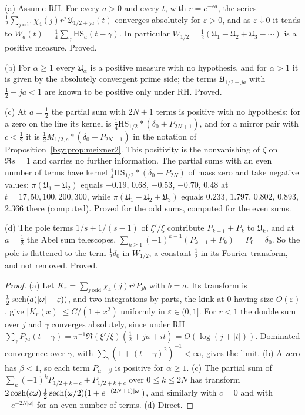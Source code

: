 \begin{proposition}\label{bsy:prop:levelser}
(a) Assume RH. For every $a>0$ and every $t$, with $r=e^{-\varepsilon a}$, the series $\tfrac12\sum_{j\ \mathrm{odd}}\chi_4(j)r^j\,\mathfrak U_{1/2+ja}(t)$ converges absolutely for $\varepsilon>0$, and as $\varepsilon\downarrow0$ it tends to $W_a(t)=\frac14\sum_\gamma\mathrm{HS}_a(t-\gamma)$. In particular $W_{1/2}=\tfrac12(\mathfrak U_1-\mathfrak U_2+\mathfrak U_3-\cdots)$ is a positive measure. Proved.

(b) For $\alpha\ge1$ every $\mathfrak U_\alpha$ is a positive measure with no hypothesis, and for $\alpha>1$ it is given by the absolutely convergent prime side; the terms $\mathfrak U_{1/2+ja}$ with $\frac12+ja<1$ are known to be positive only under RH. Proved.

(c) At $a=\frac12$ the partial sum with $2N+1$ terms is positive with no hypothesis: for a zero on the line its kernel is $\frac14\mathrm{HS}_{1/2}*(\delta_0+P_{2N+1})$, and for a mirror pair with $c<\frac12$ it is $\frac12M_{1/2,c}*(\delta_0+P_{2N+1})$ in the notation of Proposition~\ref{bsy:prop:meixner2}. This positivity is the nonvanishing of $\zeta$ on $\Re s=1$ and carries no further information. The partial sums with an even number of terms have kernel $\frac14\mathrm{HS}_{1/2}*(\delta_0-P_{2N})$ of mass zero and take negative values: $\pi(\mathfrak U_1-\mathfrak U_2)$ equals $-0.19$, $0.68$, $-0.53$, $-0.70$, $0.48$ at $t=17,50,100,200,300$, while $\pi(\mathfrak U_1-\mathfrak U_2+\mathfrak U_3)$ equals $0.233$, $1.797$, $0.802$, $0.893$, $2.366$ there (computed). Proved for the odd sums, computed for the even sums.

(d) The pole terms $1/s+1/(s-1)$ of $\xi'/\xi$ contribute $P_{k-1}+P_k$ to $\mathfrak U_k$, and at $a=\frac12$ the Abel sum telescopes, $\sum_{k\ge1}(-1)^{k-1}(P_{k-1}+P_k)=P_0=\delta_0$. So the pole is flattened to the term $\frac12\delta_0$ in $W_{1/2}$, a constant $\frac12$ in its Fourier transform, and not removed. Proved.
\end{proposition}

\begin{proof}
(a) Let $K_r=\sum_{j\ \mathrm{odd}}\chi_4(j)r^jP_{jb}$ with $b=a$. Its transform is $\frac12\operatorname{sech}(a(|\omega|+\varepsilon))$, and two integrations by parts, the kink at $0$ having size $O(\varepsilon)$, give $|K_r(x)|\le C/(1+x^2)$ uniformly in $\varepsilon\in(0,1]$. For $r<1$ the double sum over $j$ and $\gamma$ converges absolutely, since under RH $\sum_\gamma P_{ja}(t-\gamma)=\pi^{-1}\Re(\xi'/\xi)(\frac12+ja+it)=O(\log(j+|t|))$. Dominated convergence over $\gamma$, with $\sum_\gamma(1+(t-\gamma)^2)^{-1}<\infty$, gives the limit. (b) A zero has $\beta<1$, so each term $P_{\alpha-\beta}$ is positive for $\alpha\ge1$. (c) The partial sum of $\sum_k(-1)^kP_{1/2+k-c}+P_{1/2+k+c}$ over $0\le k\le2N$ has transform $2\cosh(c\omega)\,\tfrac12\operatorname{sech}(\omega/2)(1+e^{-(2N+1)|\omega|})$, and similarly with $c=0$ and with $-e^{-2N|\omega|}$ for an even number of terms. (d) Direct.
\end{proof}

